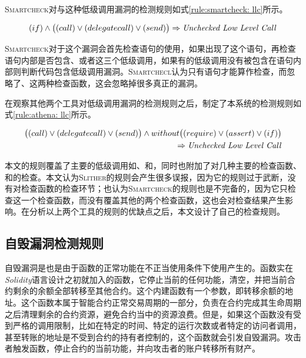 \textsc{Smartcheck}对与这种低级调用漏洞的检测规则如式\ref{rule:smartcheck: llc}所示。
\begin{mdframed}[
	linewidth = 1pt,
	innertopmargin = -5pt,
	innerbottommargin = 3pt,
	outerlinewidth = 1pt
	]
    \small
	\begin{equation} \label{rule:smartcheck: llc}
    (if) \wedge \big ((call) \vee (delegatecall) \vee (send) \big ) \Rightarrow \text{\emph{Unchecked Low Level Call}}
	\end{equation}
\end{mdframed}
\textsc{Smartcheck}对于这个漏洞会首先检查语句的使用，如果出现了这个语句，再检查语句内部是否包含、或者这三个低级调用，如果有的低级调用没有被包含在语句内部则判断代码包含低级调用漏洞。\textsc{Smartchecl}认为只有语句才能算作检查，而忽略了、这两种检查函数，这会忽略掉很多真正的漏洞。

在观察其他两个工具对低级调用漏洞的检测规则之后，制定了本系统的检测规则如式\ref{rule:athena: llc}所示。
\begin{mdframed}[
	linewidth = 1pt,
	innertopmargin = -5pt,
	innerbottommargin = 3pt,
	outerlinewidth = 1pt
	]
    \small
	\begin{equation} \label{rule:athena: llc}
    \begin{split}
       \big ((call) \vee (delegatecall) \vee (send)\big ) \wedge without \big ((require) \vee (assert) \vee (if)\big )  \\
        \Rightarrow \text{\emph{Unchecked Low Level Call}}
    \end{split}
	\end{equation}
\end{mdframed}
本文的规则覆盖了主要的低级调用如、和，同时也附加了对几种主要的检查函数、和的检查。本文认为\textsc{Slither}的规则会产生很多误报，因为它的规则过于武断，没有对检查函数的检查环节；也认为\textsc{Smartcheck}的规则也是不完备的，因为它只检查这一个检查函数，而没有覆盖其他的两个检查函数，这也会对检查结果产生影响。在分析以上两个工具的规则的优缺点之后，本文设计了自己的检查规则。

\subsection{自毁漏洞检测规则}
自毁漏洞是也是由于函数的正常功能在不正当使用条件下使用产生的。函数实在\emph{Solidity}语言设计之初就加入的函数，它停止当前的任何功能，清空，并把当前合约剩余的余额全部转移至其他合约。这个内建函数有一个参数，即转移余额的地址。这个函数本属于智能合约正常交易周期的一部分，负责在合约完成其生命周期之后清理剩余的合约资源，避免合约当中的资源浪费。但是，如果这个函数没有受到严格的调用限制，比如在特定的时间、特定的运行次数或者特定的访问者调用，甚至转账的地址是不受到合约的持有者控制的，这个函数就会引发自毁漏洞。攻击者触发函数，停止合约的当前功能，并向攻击者的账户转移所有财产。

